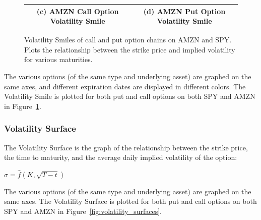 \documentclass[10pt]{article}
\begin{document}
\begin{figure}[!hb]
\begin{tabular}{|c|c|}
                (c) AMZN Call Option Volatility Smile &
                (d) AMZN Put Option Volatility Smile \\
                \hline
            \end{tabular}
            \caption{Volatility Smiles of call and put option chains on AMZN and SPY. Plots the relationship between the strike price and implied volatility for various maturities.}
            \label{fig:volatility_smiles}
        \end{figure}

        The various options (of the same type and underlying asset) are graphed on the same axes, and different expiration dates are displayed in different colors. The Volatility Smile is plotted for both put and call options on both SPY and AMZN in Figure~\ref{fig:volatility_smiles}.

        \subsubsection{Volatility Surface}

        The Volatility Surface is the graph of the relationship between the strike price, the time to maturity, and the average daily implied volatility of the option:
        
        \begin{center}
            $\hat{\sigma} = \hat{f}(K, \sqrt{T - t})$
        \end{center}

        The various options (of the same type and underlying asset) are graphed on the same axes. The Volatility Surface is plotted for both put and call options on both SPY and AMZN in Figure~\ref{fig:volatility_surfaces}.
\end{document}
